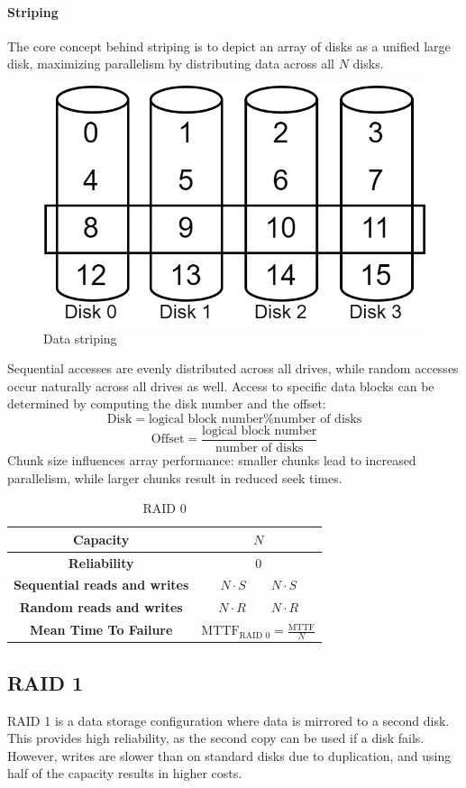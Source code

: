 \paragraph*{Striping}
The core concept behind striping is to depict an array of disks as a unified large disk, maximizing parallelism by distributing data across all $N$ disks.
\begin{figure}[H]
    \centering
    \includegraphics[width=0.3\linewidth]{images/strip.png}
    \caption{Data striping}
\end{figure}
Sequential accesses are evenly distributed across all drives, while random accesses occur naturally across all drives as well. 
Access to specific data blocks can be determined by computing the disk number and the offset:
\[\text{Disk}=\text{logical block number} \% \text{number of disks}\]
\[\text{Offset}=\dfrac{\text{logical block number}}{\text{number of disks}}\]
Chunk size influences array performance: smaller chunks lead to increased parallelism, while larger chunks result in reduced seek times.
\renewcommand*{\arraystretch}{2}
\begin{table}[H]
    \centering
    \begin{tabular}{|cc|}
    \hline
    \textbf{Capacity}                    & $N$                                                 \\ \hline
    \textbf{Reliability}                 & $0$                                                 \\ \hline
    \textbf{Sequential reads and writes} & $N\cdot S \qquad N\cdot S$                          \\ \hline
    \textbf{Random reads and writes}     & $N\cdot R \qquad N\cdot R$                          \\ \hline
    \textbf{Mean Time To Failure}        & $\text{MTTF}_{\text{RAID }0}=\frac{\text{MTTF}}{N}$ \\ \hline
    \end{tabular}
    \caption{RAID 0}
\end{table}

\subsection{RAID 1}
RAID 1 is a data storage configuration where data is mirrored to a second disk. 
This provides high reliability, as the second copy can be used if a disk fails. 
However, writes are slower than on standard disks due to duplication, and using half of the capacity results in higher costs.


